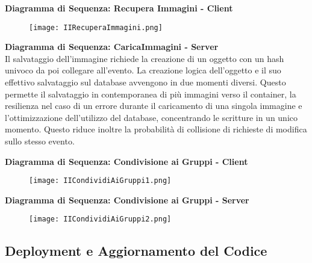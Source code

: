 \textbf{Diagramma di Sequenza: Recupera Immagini - Client}\\
\begin{figure}[h!]
    \begin{center}
        \texttt{[image: IIRecuperaImmagini.png]}
    \end{center}
\end{figure}
\clearpage                                                                      
\textbf{Diagramma di Sequenza: CaricaImmagini - Server}\\
Il salvataggio dell'immagine richiede la creazione di un oggetto con un hash univoco da poi collegare all'evento. 
La creazione logica dell'oggetto e il suo effettivo salvataggio sul database avvengono in due momenti diversi. 
Questo permette il salvataggio in contemporanea di più immagini verso il container, 
la resilienza nel caso di un errore durante il caricamento di una singola immagine e
l'ottimizzazione dell'utilizzo del database, concentrando le scritture in un unico momento.
Questo riduce inoltre la probabilità di collisione di richieste di modifica sullo stesso evento.
\begin{figure}[h!]
    \centering
\end{figure}
\clearpage

\textbf{Diagramma di Sequenza: Condivisione ai Gruppi - Client}\\
\begin{figure}[h!]
    \begin{center}
        \texttt{[image: IICondividiAiGruppi1.png]}
    \end{center}
\end{figure}

\textbf{Diagramma di Sequenza: Condivisione ai Gruppi - Server}\\
\begin{figure}[h!]
    \begin{center}
        \texttt{[image: IICondividiAiGruppi2.png]}
    \end{center}
\end{figure}
\clearpage

\subsection{Deployment e Aggiornamento del Codice}

